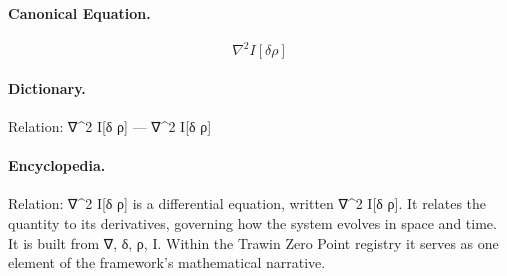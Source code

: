 \paragraph{Canonical Equation.}
\[
\nabla^2 I[\delta \rho]
\]

\paragraph{Dictionary.}
Relation: ∇\textasciicircum{}2 I[δ ρ] — ∇\textasciicircum{}2 I[δ ρ]

\paragraph{Encyclopedia.}
Relation: ∇\textasciicircum{}2 I[δ ρ] is a differential equation, written ∇\textasciicircum{}2 I[δ ρ]. It relates the quantity to its derivatives, governing how the system evolves in space and time. It is built from ∇, δ, ρ, I. Within the Trawin Zero Point registry it serves as one element of the framework's mathematical narrative.
